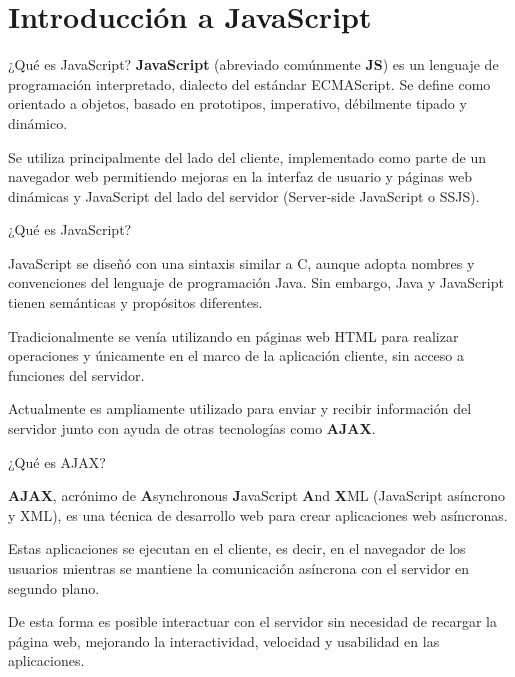 
\section{Introducción a JavaScript}

\begin{frame}[c]{¿Qué es JavaScript?}
  \textbf{JavaScript} (abreviado comúnmente \textbf{JS}) es un lenguaje de
  programación interpretado, dialecto del estándar ECMAScript. Se define
  como orientado a objetos, basado en prototipos, imperativo, débilmente
  tipado y dinámico. 

  \vspace{\baselineskip}
  Se utiliza principalmente del lado del cliente, implementado como parte
  de un navegador web permitiendo mejoras en la interfaz de usuario y
  páginas web dinámicas y JavaScript del lado del servidor (Server-side
  JavaScript o SSJS).
\end{frame}

\begin{frame}[c]{¿Qué es JavaScript?}

  JavaScript se diseñó con una sintaxis similar a C, aunque adopta nombres
  y convenciones del lenguaje de programación Java. Sin embargo, Java y
  JavaScript tienen semánticas y propósitos diferentes.

  \vspace{\baselineskip}
  Tradicionalmente se venía utilizando en páginas web HTML para realizar
  operaciones y únicamente en el marco de la aplicación cliente, sin acceso
  a funciones del servidor.

  \vspace{\baselineskip}
  Actualmente es ampliamente utilizado para enviar y recibir información del
  servidor junto con ayuda de otras tecnologías como \textbf{AJAX}.

\end{frame}

\begin{frame}[c]{¿Qué es AJAX?}

  \textbf{AJAX}, acrónimo de \textbf{A}synchronous \textbf{J}avaScript
  \textbf{A}nd \textbf{X}ML (JavaScript asíncrono y XML), es una técnica
  de desarrollo web para crear aplicaciones web asíncronas.

  \vspace{\baselineskip}
  Estas aplicaciones se ejecutan en el cliente, es decir, en el navegador
  de los usuarios mientras se mantiene la comunicación asíncrona con el
  servidor en segundo plano.

  \vspace{\baselineskip}
  De esta forma es posible interactuar con el
  servidor sin necesidad de recargar la página web, mejorando la
  interactividad, velocidad y usabilidad en las aplicaciones.
\end{frame}
